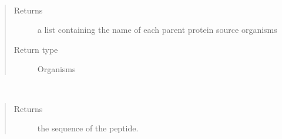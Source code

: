 \documentclass[letterpaper,10pt,english]{sphinxmanual}
\begin{document}
\begin{fulllineitems}
\begin{fulllineitems}
\begin{quote}
\begin{description}
\end{description}\end{quote}

\end{fulllineitems}


\begin{fulllineitems}
\label{\detokenize{IPTK.Classes:IPTK.Classes.Peptide.Peptide.get_parent_proteins}}
\end{fulllineitems}


\begin{fulllineitems}
\label{\detokenize{IPTK.Classes:IPTK.Classes.Peptide.Peptide.get_parents_org}}~\begin{quote}\begin{description}
\item[{Returns}] \leavevmode
a list containing the name of each parent protein source organisms

\item[{Return type}] \leavevmode
Organisms

\end{description}\end{quote}

\end{fulllineitems}


\begin{fulllineitems}
\label{\detokenize{IPTK.Classes:IPTK.Classes.Peptide.Peptide.get_peptide_seq}}~\begin{quote}\begin{description}
\item[{Returns}] \leavevmode
the sequence of the peptide.


\end{description}
\end{quote}
\end{fulllineitems}
\end{fulllineitems}
\end{document}
